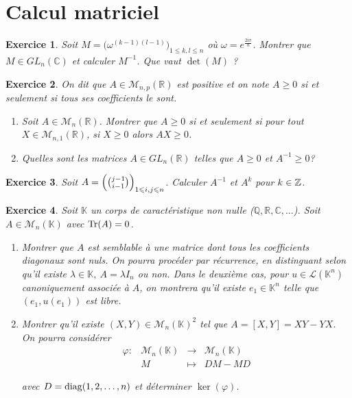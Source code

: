 \documentclass[12pt]{article}
\newtheorem{exercise}{Exercice}[section]
\theoremstyle{remark}
\theoremstyle{remark}
\newcommand{\K}{\mathbb{K}} \newcommand{\R}{\mathbb{R}}
\newcommand{\C}{\mathbb{C}} \newcommand{\Q}{\mathbb{Q}}
\newcommand{\M}{\mathcal{M}} \renewcommand{\L}{\mathcal{L}}
\newcommand{\function}[5]{
	$$
	\begin{array}{rccl}
		#1: & #2 & \to & #3 \\
		& #4 & \mapsto & #5
	\end{array}
	$$
}
\begin{document}
\cleardoublepage
\section{Calcul matriciel}

\begin{exercise}
	Soit $M=\bigl(\omega^{(k-1)(l-1)}\bigr)_{1\leqslant k,l\leqslant n}$ où
	$\omega=e^{\frac{2\mathrm{i}\pi}{n}}$. Montrer que $M\in GL_{n}(\C)$ et
	calculer $M^{-1}$. Que vaut $\det(M)$ ?
\end{exercise}

\begin{exercise}
	On dit que $A\in\M_{n,p}(\R)$ est positive et on note $A\geqslant0$ si et
	seulement si tous ses coefficients le sont.
	\begin{enumerate}
		\item
		Soit $A\in\M_{n}(\R)$. Montrer que $A\geqslant0$ si et seulement si pour
		tout $X\in\M_{n,1}(\R)$, si $X\geqslant0$ alors $AX\geqslant0$.
		\item
		Quelles sont les matrices $A\in GL_{n}(\R)$ telles que $A\geqslant0$ et
		$A^{-1}\geqslant0$?
	\end{enumerate}
\end{exercise}

\begin{exercise}
	Soit $A=\Bigl(\binom{j-1}{i-1}\Bigr)_{1\leqslant i,j\leqslant n}$. Calculer
	$A^{-1}$ et $A^{k}$ pour $k\in\mathbb{Z}$.
\end{exercise}

\begin{exercise}
	Soit $\K$ un corps de caractéristique non nulle ($\Q,\R,\C,\dots$). Soit
	$A\in\M_{n}(\K)$ avec $\operatorname{Tr}(A)=0$.
	\begin{enumerate}
		\item
		Montrer que $A$ est semblable à une matrice dont tous les coefficients
		diagonaux sont nuls. On pourra procéder par récurrence, en distinguant
		selon qu'il existe $\lambda\in\K,~A=\lambda I_{n}$ ou non. Dans le
		deuxième cas, pour $u\in\L(\K^{n})$ canoniquement associée à $A$, on
		montrera qu'il existe $e_{1}\in\K^{n}$ telle que $(e_{1},u(e_{1}))$ est
		libre.
		\item
		Montrer qu'il existe $(X,Y)\in\M_{n}(\K)^{2}$ tel que $A=[X,Y]=XY-YX$. On
		pourra considérer \function{\varphi}{\M_{n}(\K)}{\M_{n}(\K)}{M}{DM-MD}
		avec $D=\operatorname{diag}(1,2,\dots,n)$ et déterminer $\ker(\varphi)$.
	\end{enumerate}
\end{exercise}
\end{document}
